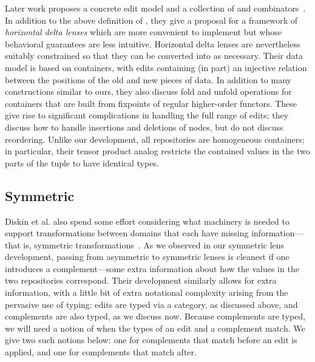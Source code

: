 Later work proposes a concrete edit model and a collection of \WBADLs and
combinators~\cite{Pacheco2012}. In addition to the above definition of
\WBADLs, they give a proposal for a framework of \emph{horizontal delta
lenses} which are more convenient to implement but whose behavioral
guarantees are less intuitive. Horizontal delta lenses are nevertheless
suitably constrained so that they can be converted into \WBADLs as
necessary. Their data model is based on containers, with edits containing
(in part) an injective relation between the positions of the old and new
pieces of data. In addition to many constructions similar to ours, they also
discuss fold and unfold operations for containers that are built from
fixpoints of regular higher-order functors. These give rise to significant
complications in handling the full range of edits; they discuss how to
handle insertions and deletions of nodes, but do not discuss reordering.
Unlike our development, all repositories are homogeneous containers; in
particular, their tensor product analog restricts the contained values in
the two parts of the tuple to have identical types.

\subsection{Symmetric}
\label{sec:delta:symmetric}
Diskin et al. also spend some effort considering what machinery is needed to
support transformations between domains that each have missing
information---that is, symmetric transformations~\cite{Diskin-Delta11}. As
we observed in our symmetric lens development, passing from asymmetric to
symmetric lenses is cleanest if one introduces a complement---some extra
information about how the values in the two repositories correspond. Their
development similarly allows for extra information, with a little bit of
extra notational complexity arising from the pervasive use of typing: edits
are typed via a category, as discussed above, and complements are also
typed, as we discuss now. Because complements are typed, we will need a
notion of when the types of an edit and a complement match. We give two such
notions below: one for complements that match before an edit is applied, and
one for complements that match after.

